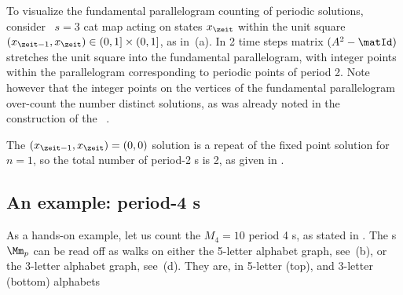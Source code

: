 To visualize the fundamental parallelogram  counting of
periodic solutions, consider \PV\ $s=3$ cat map 
acting on states $\ssp_{\zeit}$ within the unit square
$(\ssp_{\zeit-1},\ssp_{\zeit})\in(0,1]\times(0,1]$, as in
\,(a). In 2 time steps matrix $(A^2 - \matId)$
stretches the unit square into the fundamental parallelogram, with
integer points within the parallelogram corresponding to periodic points
of period 2. Note however that the integer points on the vertices of the
fundamental parallelogram over-count the number distinct solutions, as was
already noted in the construction of the \tzeta\ .

The
$(\ssp_{\zeit-1},\ssp_{\zeit})=(0,0)$ solution is a repeat of the fixed
point solution for $n=1$, so the total number of period-2 {\orbit}s is
2, as given in .

\subsection{An example: period-4 {\orbit}s}
\label{s:cat4cycles}

As a hands-on example, let us count the $M_4=10$ {\admissible} period 4 {\orbit}s, as stated in .
The {\admissible} \brick s $\Mm_p$ can be read off as walks on
either the 5-letter alphabet  graph, see
\,(b),
or the 3-letter alphabet  graph, see
\,(d). They are, in 5-letter (top), and
3-letter (bottom) alphabets

